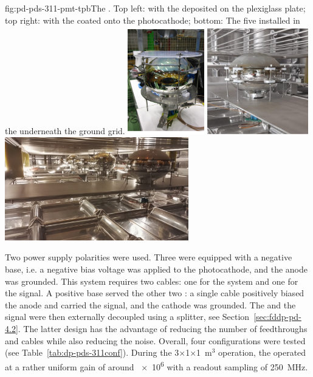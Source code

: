 \begin{dunefigure}{fig:pd-pds-311-pmt-tpb}{The  . Top left:  with the  deposited on the plexiglass plate; top right:  with the  coated onto the photocathode; bottom: The five  installed in the  underneath the ground grid.}
\includegraphics[width=0.25\textwidth]{graphics/dppd_PMTPlate}
\includegraphics[width=0.33\textwidth]{graphics/dppd_PMTTPB.jpeg}\\
\includegraphics[width=0.6\textwidth]{graphics/dppd_PMT_311_installation.jpg}
\end{dunefigure}

Two power supply polarities were used. Three  were equipped with a negative  base, i.e. a negative bias voltage was applied to the photocathode, and the anode was grounded. This system requires two cables: one for the  system and one for the signal. A positive base served the other two : a single cable positively biased the anode and carried the signal, and the cathode was grounded. The  and the signal were then externally decoupled using a splitter, see Section~\ref{sec:fddp-pd-4.2}. The latter design has the advantage of reducing the number of feedthroughs and cables while also reducing the noise. Overall, four configurations were tested (see Table~\ref{tab:dp-pds-311conf}). During the 3$\times$1$\times$1~m$^3$ operation, the  operated at a rather uniform gain of around \num{e6} with a readout sampling of \SI{250}{MHz}.

